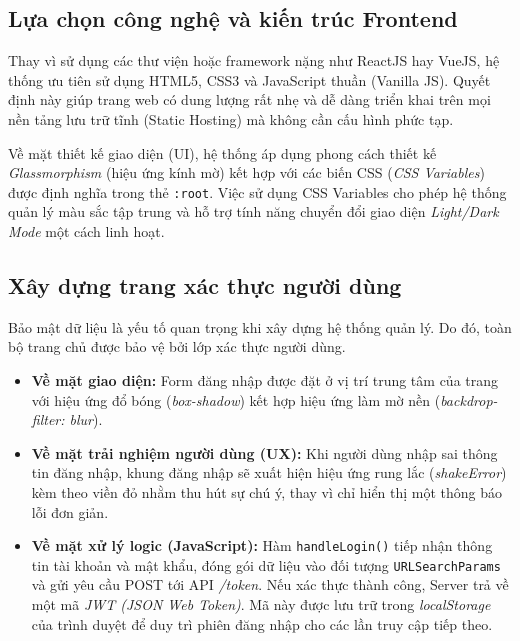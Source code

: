 \documentclass[12pt,a4paper]{report}
\begin{document}
\subsection{Lựa chọn công nghệ và kiến trúc Frontend}

Thay vì sử dụng các thư viện hoặc framework nặng như ReactJS hay VueJS, hệ thống ưu tiên sử dụng HTML5, CSS3 và JavaScript thuần (Vanilla JS).  
Quyết định này giúp trang web có dung lượng rất nhẹ và dễ dàng triển khai trên mọi nền tảng lưu trữ tĩnh (Static Hosting) mà không cần cấu hình phức tạp.

Về mặt thiết kế giao diện (UI), hệ thống áp dụng phong cách thiết kế \textit{Glassmorphism} (hiệu ứng kính mờ) kết hợp với các biến CSS (\textit{CSS Variables}) được định nghĩa trong thẻ \texttt{:root}.  
Việc sử dụng CSS Variables cho phép hệ thống quản lý màu sắc tập trung và hỗ trợ tính năng chuyển đổi giao diện \textit{Light/Dark Mode} một cách linh hoạt.

\subsection{Xây dựng trang xác thực người dùng}

Bảo mật dữ liệu là yếu tố quan trọng khi xây dựng hệ thống quản lý. Do đó, toàn bộ trang chủ được bảo vệ bởi lớp xác thực người dùng.

\begin{itemize}

\item \textbf{Về mặt giao diện:}  
Form đăng nhập được đặt ở vị trí trung tâm của trang với hiệu ứng đổ bóng (\textit{box-shadow}) kết hợp hiệu ứng làm mờ nền (\textit{backdrop-filter: blur}).

\item \textbf{Về mặt trải nghiệm người dùng (UX):}  
Khi người dùng nhập sai thông tin đăng nhập, khung đăng nhập sẽ xuất hiện hiệu ứng rung lắc (\textit{shakeError}) kèm theo viền đỏ nhằm thu hút sự chú ý, thay vì chỉ hiển thị một thông báo lỗi đơn giản.

\item \textbf{Về mặt xử lý logic (JavaScript):}  
Hàm \texttt{handleLogin()} tiếp nhận thông tin tài khoản và mật khẩu, đóng gói dữ liệu vào đối tượng \texttt{URLSearchParams} và gửi yêu cầu POST tới API \textit{/token}.  
Nếu xác thực thành công, Server trả về một mã \textit{JWT (JSON Web Token)}. Mã này được lưu trữ trong \textit{localStorage} của trình duyệt để duy trì phiên đăng nhập cho các lần truy cập tiếp theo.

\end{itemize}
\end{document}

